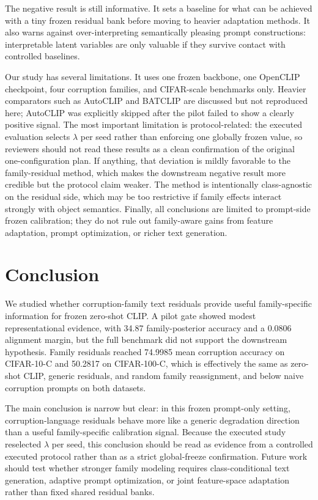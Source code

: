 \documentclass{article}
\begin{document}
The negative result is still informative. It sets a baseline for what can be achieved with a tiny frozen residual bank before moving to heavier adaptation methods. It also warns against over-interpreting semantically pleasing prompt constructions: interpretable latent variables are only valuable if they survive contact with controlled baselines.

Our study has several limitations. It uses one frozen backbone, one OpenCLIP checkpoint, four corruption families, and CIFAR-scale benchmarks only. Heavier comparators such as AutoCLIP and BATCLIP are discussed but not reproduced here; AutoCLIP was explicitly skipped after the pilot failed to show a clearly positive signal. The most important limitation is protocol-related: the executed evaluation selects $\lambda$ per seed rather than enforcing one globally frozen value, so reviewers should not read these results as a clean confirmation of the original one-configuration plan. If anything, that deviation is mildly favorable to the family-residual method, which makes the downstream negative result more credible but the protocol claim weaker. The method is intentionally class-agnostic on the residual side, which may be too restrictive if family effects interact strongly with object semantics. Finally, all conclusions are limited to prompt-side frozen calibration; they do not rule out family-aware gains from feature adaptation, prompt optimization, or richer text generation.

\section{Conclusion}

We studied whether corruption-family text residuals provide useful family-specific information for frozen zero-shot CLIP. A pilot gate showed modest representational evidence, with 34.87 family-posterior accuracy and a 0.0806 alignment margin, but the full benchmark did not support the downstream hypothesis. Family residuals reached 74.9985 mean corruption accuracy on CIFAR-10-C and 50.2817 on CIFAR-100-C, which is effectively the same as zero-shot CLIP, generic residuals, and random family reassignment, and below naive corruption prompts on both datasets.

The main conclusion is narrow but clear: in this frozen prompt-only setting, corruption-language residuals behave more like a generic degradation direction than a useful family-specific calibration signal. Because the executed study reselected $\lambda$ per seed, this conclusion should be read as evidence from a controlled executed protocol rather than as a strict global-freeze confirmation. Future work should test whether stronger family modeling requires class-conditional text generation, adaptive prompt optimization, or joint feature-space adaptation rather than fixed shared residual banks.
\end{document}
